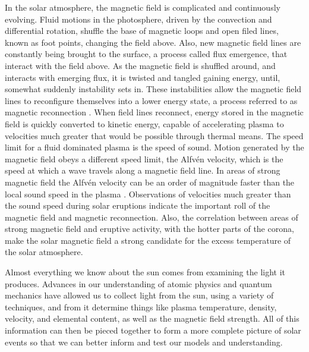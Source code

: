 In the solar atmosphere, the magnetic field is complicated and continuously evolving.
Fluid motions in the photosphere, driven by the convection and differential rotation, shuffle the base of magnetic loops and open filed lines, known as foot points, changing the field above.
Also, new magnetic field lines are constantly being brought to the surface, a process called flux emergence, that interact with the field above.
As the magnetic field is shuffled around, and interacts with emerging flux, it is twisted and tangled gaining energy, until, somewhat suddenly instability sets in.
These instabilities allow the magnetic field lines to reconfigure themselves into a lower energy state, a process referred to as magnetic reconnection \citep{Parker1957,Petschek1964}.
When field lines reconnect, energy stored in the magnetic field is quickly converted to kinetic energy, capable of accelerating plasma to velocities much greater that would be possible through thermal means.
The speed limit for a fluid dominated plasma is the speed of sound.
Motion generated by the magnetic field obeys a different speed limit, the Alfv\' en velocity, which is the speed at which a wave travels along a magnetic field line.
In areas of strong magnetic field the Alfv\' en velocity can be an order of magnitude faster than the local sound speed in the plasma \citep{Priest2014}.
Observations of velocities much greater than the sound speed during solar eruptions indicate the important roll of the magnetic field and magnetic reconnection.
Also, the correlation between areas of strong magnetic field and eruptive activity, with the hotter parts of the corona, make the solar magnetic field a strong candidate for the excess temperature of the solar atmosphere.


Almost everything we know about the sun comes from examining the light it produces.
Advances in our understanding of atomic physics and quantum mechanics have allowed us to collect light from the sun, using a variety of techniques, and from it determine things like plasma temperature, density, velocity, and elemental content, as well as the magnetic field strength.
All of this information can then be pieced together to form a more complete picture of solar events so that we can better inform and test our models and understanding.

